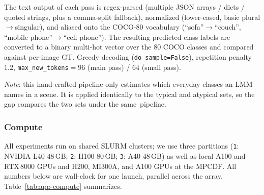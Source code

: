 The text output of each pass is regex-parsed (multiple JSON arrays
/ dicts / quoted strings, plus a comma-split fallback), normalized
(lower-cased, basic plural$\to$singular), and aliased onto the
COCO-80 vocabulary (\eg ``sofa''$\to$``couch'', ``mobile phone''$\to$``cell phone''). The resulting predicted class labels are converted to a binary multi-hot vector over the $80$ COCO classes and compared against per-image GT. Greedy decoding (\texttt{do\_sample=False}), repetition penalty
$1.2$, \texttt{max\_new\_tokens}$=96$ (main pass) / $64$ (small
pass).

\noindent\emph{Note}: this hand-crafted pipeline only estimates which everyday classes an LMM names in a scene. It is applied identically to the typical and atypical sets, so the gap compares the two sets under the same~pipeline. 

\subsubsection{Compute}\label{app:exp-compute}

All experiments run on shared SLURM clusters; we use three partitions
(\texttt{1}: NVIDIA L40 48\,GB; \texttt{2}: H100 80\,GB; \texttt{3}: A40 48\,GB) as well as local A100 and RTX\,8000 GPUs and H200, MI300A, and A100 GPUs at the MPCDF. All numbers below are wall-clock for one launch, parallel across the array. Table~\ref{tab:app-compute} summarizes.

